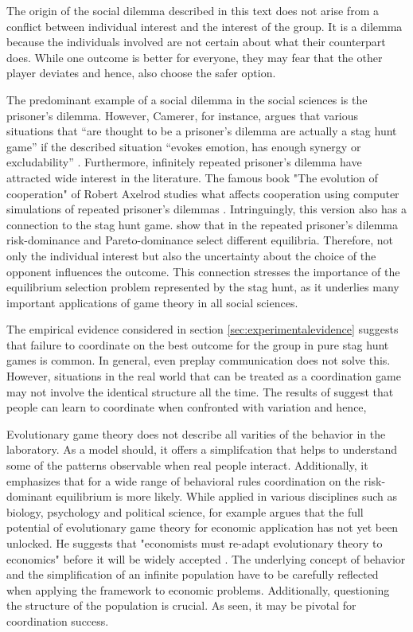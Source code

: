 
The origin of the social dilemma described in this text does not arise
from a conflict between individual interest and the interest of the group.
It is a dilemma because the individuals involved are not certain about
what their counterpart does. While one outcome is better for everyone, 
they may fear that the other player deviates and hence, also choose 
the safer option. 

The predominant example of a social dilemma in the 
social sciences is the prisoner's dilemma. However, 
Camerer, for instance, argues that various situations that 
``are thought to be a prisoner's 
dilemma are actually a stag hunt game'' 
if the described situation ``evokes emotion, 
has enough synergy or excludability'' 
\parencite[376-377]{camerer_behavioral_2003}. Furthermore, infinitely
repeated prisoner's dilemma have attracted wide interest in the literature.
The famous book "The evolution of cooperation" of Robert Axelrod studies
what affects cooperation using computer simulations of repeated prisoner's
dilemmas \parencite{axelrod_evolution_2006}. Intringuingly, this version
also has a connection to the stag hunt game. \textcite{blonski_prisoners_2015}
show that in the repeated prisoner's dilemma risk-dominance and 
Pareto-dominance select different equilibria. Therefore, not only
the individual interest but also the uncertainty about the choice of the
opponent influences the outcome.
This connection stresses the importance of the equilibrium selection problem
represented by the stag hunt, 
as it underlies many important applications of game theory in all 
social sciences. 

The empirical evidence considered in section \ref{sec:experimentalevidence}
suggests that failure to coordinate on the best outcome for the group
in pure stag hunt games is common. 
In general, even preplay communication does not solve this.
However, situations in the real world that can be treated as a coordination
game may not involve the identical structure all the time. The
results of \textcite{rankin_strategic_2000} suggest that people can learn 
to coordinate when confronted with variation and hence,  

Evolutionary game theory does not describe all varities of the 
behavior in the laboratory. As a model should, it offers a simplifcation
that helps to understand some of the patterns observable when real people
interact. Additionally, it emphasizes that for a wide range
of behavioral rules coordination on the risk-dominant equilibrium
is more likely. While applied in various disciplines such as biology, 
psychology and political science, for example 
\textcite{friedman_economic_1998} argues that the full potential
of evolutionary game theory for economic application 
has not yet been unlocked. He suggests that "economists must re-adapt
evolutionary theory to economics" before it will be widely accepted 
\parencite[18]{friedman_economic_1998}. The underlying concept of behavior and
the simplification of an infinite population have to be carefully reflected
when applying the framework to economic problems. Additionally, questioning
the structure of the population is crucial. As seen, it may be pivotal
for coordination success. 
